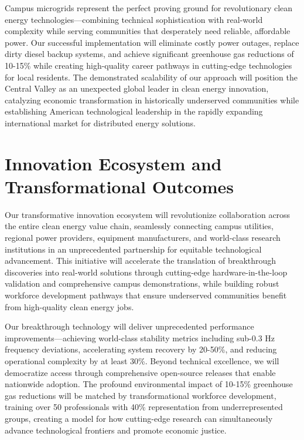 \documentclass[12pt]{article}
\begin{document}
Campus microgrids represent the perfect proving ground for revolutionary clean energy technologies---combining technical sophistication with real-world complexity while serving communities that desperately need reliable, affordable power. Our successful implementation will eliminate costly power outages, replace dirty diesel backup systems, and achieve significant greenhouse gas reductions of 10-15\% while creating high-quality career pathways in cutting-edge technologies for local residents. The demonstrated scalability of our approach will position the Central Valley as an unexpected global leader in clean energy innovation, catalyzing economic transformation in historically underserved communities while establishing American technological leadership in the rapidly expanding international market for distributed energy solutions.

\section{Innovation Ecosystem and Transformational Outcomes}

Our transformative innovation ecosystem will revolutionize collaboration across the entire clean energy value chain, seamlessly connecting campus utilities, regional power providers, equipment manufacturers, and world-class research institutions in an unprecedented partnership for equitable technological advancement. This initiative will accelerate the translation of breakthrough discoveries into real-world solutions through cutting-edge hardware-in-the-loop validation and comprehensive campus demonstrations, while building robust workforce development pathways that ensure underserved communities benefit from high-quality clean energy jobs.

Our breakthrough technology will deliver unprecedented performance improvements---achieving world-class stability metrics including sub-0.3 Hz frequency deviations, accelerating system recovery by 20-50\%, and reducing operational complexity by at least 30\%. Beyond technical excellence, we will democratize access through comprehensive open-source releases that enable nationwide adoption. The profound environmental impact of 10-15\% greenhouse gas reductions will be matched by transformational workforce development, training over 50 professionals with 40\% representation from underrepresented groups, creating a model for how cutting-edge research can simultaneously advance technological frontiers and promote economic justice.
\end{document}
